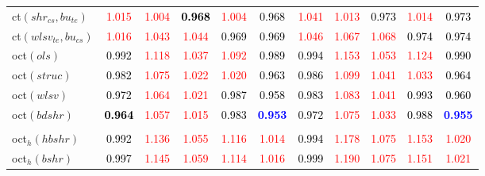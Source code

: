 \begin{tabular}[t]{l|>{}cccc>{}c|ccccc}
ct$(shr_{cs}, bu_{te})$ & \textcolor{red}{1.015} & \textcolor{red}{1.004} & \textcolor{black}{\textbf{0.968}} & \textcolor{red}{1.004} & \textcolor{black}{0.968} & \textcolor{red}{1.041} & \textcolor{red}{1.013} & \textcolor{black}{0.973} & \textcolor{red}{1.014} & \textcolor{black}{0.973}\\
ct$(wlsv_{te}, bu_{cs})$ & \textcolor{red}{1.016} & \textcolor{red}{1.043} & \textcolor{red}{1.044} & \textcolor{black}{0.969} & \textcolor{black}{0.969} & \textcolor{red}{1.046} & \textcolor{red}{1.067} & \textcolor{red}{1.068} & \textcolor{black}{0.974} & \textcolor{black}{0.974}\\
oct$(ols)$ & \textcolor{black}{0.992} & \textcolor{red}{1.118} & \textcolor{red}{1.037} & \textcolor{red}{1.092} & \textcolor{black}{0.989} & \textcolor{black}{0.994} & \textcolor{red}{1.153} & \textcolor{red}{1.053} & \textcolor{red}{1.124} & \textcolor{black}{0.990}\\
oct$(struc)$ & \textcolor{black}{0.982} & \textcolor{red}{1.075} & \textcolor{red}{1.022} & \textcolor{red}{1.020} & \textcolor{black}{0.963} & \textcolor{black}{0.986} & \textcolor{red}{1.099} & \textcolor{red}{1.041} & \textcolor{red}{1.033} & \textcolor{black}{0.964}\\
oct$(wlsv)$ & \textcolor{black}{0.972} & \textcolor{red}{1.064} & \textcolor{red}{1.021} & \textcolor{black}{0.987} & \textcolor{black}{0.958} & \textcolor{black}{0.983} & \textcolor{red}{1.083} & \textcolor{red}{1.041} & \textcolor{black}{0.993} & \textcolor{black}{0.960}\\
oct$(bdshr)$ & \textcolor{black}{\textbf{0.964}} & \textcolor{red}{1.057} & \textcolor{red}{1.015} & \textcolor{black}{0.983} & \textcolor{blue}{\textbf{0.953}} & \textcolor{black}{0.972} & \textcolor{red}{1.075} & \textcolor{red}{1.033} & \textcolor{black}{0.988} & \textcolor{blue}{\textbf{0.955}}\\[-1.5ex]
\hline\\[-1.5ex]
oct$_h(hbshr)$ & \textcolor{black}{0.992} & \textcolor{red}{1.136} & \textcolor{red}{1.055} & \textcolor{red}{1.116} & \textcolor{red}{1.014} & \textcolor{black}{0.994} & \textcolor{red}{1.178} & \textcolor{red}{1.075} & \textcolor{red}{1.153} & \textcolor{red}{1.020}\\
oct$_h(bshr)$ & \textcolor{black}{0.997} & \textcolor{red}{1.145} & \textcolor{red}{1.059} & \textcolor{red}{1.114} & \textcolor{red}{1.016} & \textcolor{black}{0.999} & \textcolor{red}{1.190} & \textcolor{red}{1.075} & \textcolor{red}{1.151} & \textcolor{red}{1.021}\\

\end{tabular}
